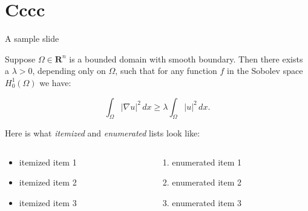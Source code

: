 \documentclass{beamer}
\begin{document}
\section{Cccc}
\begin{frame}{A sample slide}

\begin{theorem}
Suppose $\Omega\in\mathbf{R}^n$ is a bounded domain with smooth
boundary.  Then there exists a $\lambda>0$, depending only on
$\Omega$, such that for any function $f$ in the Sobolev space
$H^1_0(\Omega)$ we have:

\[
  \int_\Omega |\nabla u|^2 \,dx \ge 
  \lambda \int_\Omega |u|^2 \,dx .
\]
\end{theorem}

Here is what \emph{itemized} and \emph{enumerated} lists look like:

\begin{columns}
  \begin{column}{0.45\textwidth}
  \begin{itemize}
    \item itemized item 1
    \item itemized item 2
    \item itemized item 3
  \end{itemize}
  \end{column}

  \begin{column}{0.45\textwidth}
  \begin{enumerate}
    \item enumerated item 1
    \item enumerated item 2
    \item enumerated item 3
  \end{enumerate}
  \end{column}
\end{columns}

\end{frame}
\end{document}
